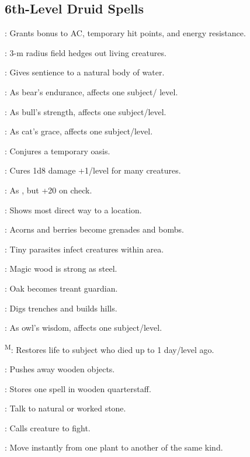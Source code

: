\subsection{6th-Level Druid Spells}

: Grants bonus to AC, temporary hit points, and energy resistance.

: 3-m radius field hedges out living creatures.

: Gives sentience to a natural body of water.

: As bear's endurance, affects one subject/ level.

: As bull's strength, affects one subject/level.

: As cat's grace, affects one subject/level.

: Conjures a temporary oasis.

: Cures 1d8 damage +1/level for many creatures.

: As , but +20 on check.

: Shows most direct way to a location.

: Acorns and berries become grenades and bombs.

: Tiny parasites infect creatures within area.

: Magic wood is strong as steel.

: Oak becomes treant guardian.

: Digs trenches and builds hills.

: As owl's wisdom, affects one subject/level.

\textsuperscript{M}: Restores life to subject who died up to 1 day/level ago.

: Pushes away wooden objects.

: Stores one spell in wooden quarterstaff.

: Talk to natural or worked stone.

: Calls creature to fight.

: Move instantly from one plant to another of the same kind.

